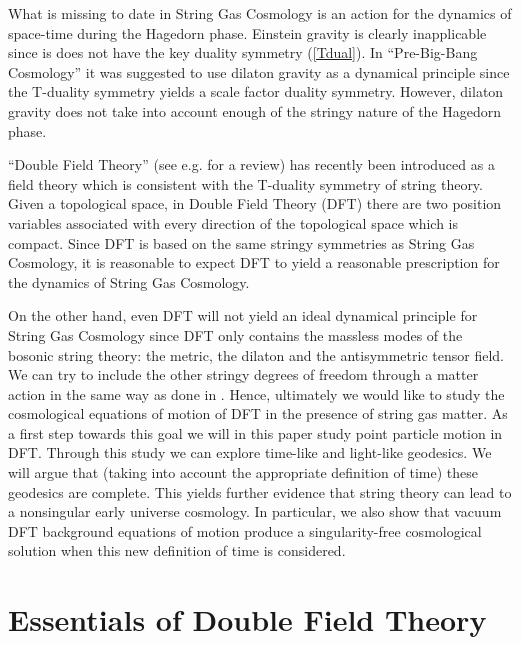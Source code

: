 \documentclass[prd, aps, superscriptaddress, preprintnumbers, twocolumn, floatfix, nofootinbib]{revtex4}
\begin{document}
What is missing to date in String Gas Cosmology is an action for the dynamics
of space-time during the Hagedorn phase. Einstein gravity is clearly inapplicable
since is does not have the key duality symmetry (\ref{Tdual}). In ``Pre-Big-Bang Cosmology''
\cite{PBB} it was suggested to use dilaton gravity as a dynamical principle since
the T-duality symmetry yields a scale factor duality symmetry. However, dilaton
gravity does not take into account enough of the stringy nature of the Hagedorn
phase.

``Double Field Theory'' \cite{Siegel:1993xq,Siegel:1993th,Siegel:1993bj,DFT} (see e.g. \cite{DFTrev} for a review)
has recently been introduced as a field theory which is
consistent with the T-duality symmetry of string theory. Given a
topological space, in Double Field Theory
(DFT) there are two position variables associated with every direction
of the topological space which is compact. Since DFT is based on the
same stringy symmetries as String Gas Cosmology, it is reasonable
to expect DFT to yield a reasonable prescription for the dynamics of
String Gas Cosmology.

On the other hand, even DFT will not yield an
ideal dynamical principle for String Gas Cosmology since DFT only
contains the massless modes of the bosonic string theory: the metric, the dilaton
and the antisymmetric tensor field. We can try to include the other
stringy degrees of freedom through a matter action in the same way
as done in \cite{BV}. Hence, ultimately we would like to study the cosmological
equations of motion of DFT in the presence of string gas matter.
As a first step towards this goal we will in this paper study point
particle motion in DFT. Through this study we can explore time-like
and light-like geodesics. We will argue that (taking into account the
appropriate definition of time) these geodesics are complete.
This yields further evidence that string theory can lead to a nonsingular
early universe cosmology. In particular, we also show that vacuum DFT background equations of motion produce a singularity-free cosmological solution when this new definition of time is considered.


\section{Essentials of Double Field Theory}
\end{document}
